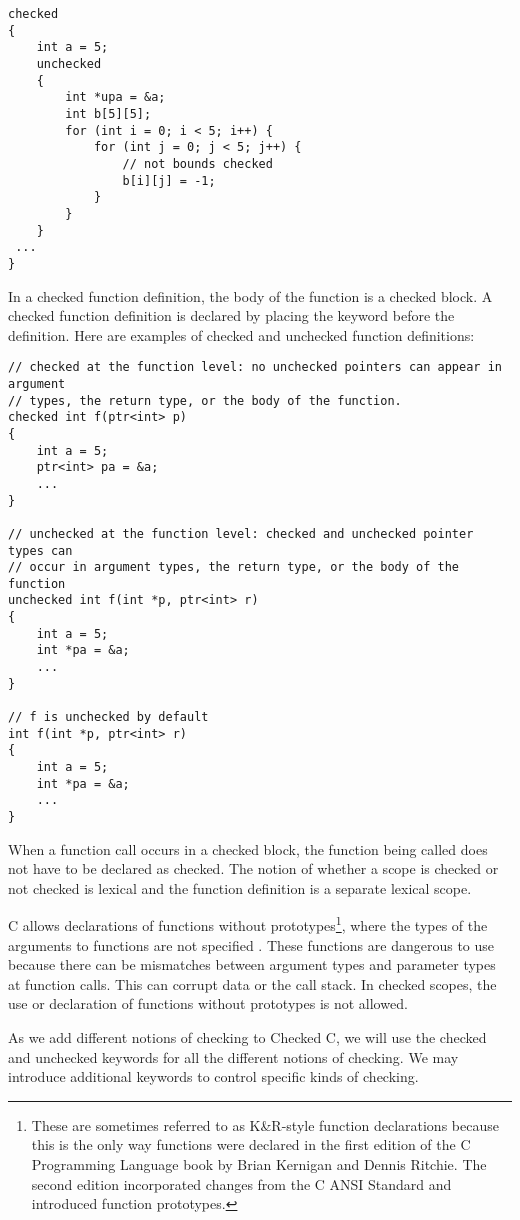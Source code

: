 \begin{verbatim}
checked 
{
    int a = 5;
    unchecked 
    {
        int *upa = &a;	
        int b[5][5];
        for (int i = 0; i < 5; i++) {
            for (int j = 0; j < 5; j++) {
                // not bounds checked
                b[i][j] = -1;
            }
        }     
    }
 ...
}
\end{verbatim}

In a checked function definition, the body of the function is a 
checked  block. A checked function definition is declared by placing the
 keyword before the definition. Here are examples of checked and
unchecked function definitions:

\begin{verbatim}
// checked at the function level: no unchecked pointers can appear in argument
// types, the return type, or the body of the function.
checked int f(ptr<int> p) 
{
    int a = 5;
    ptr<int> pa = &a;
    ...
}

// unchecked at the function level: checked and unchecked pointer types can
// occur in argument types, the return type, or the body of the function
unchecked int f(int *p, ptr<int> r)
{
    int a = 5;
    int *pa = &a;
    ...
}

// f is unchecked by default
int f(int *p, ptr<int> r)
{
    int a = 5;
    int *pa = &a;
    ...
}
\end{verbatim}

When a function call occurs in a checked block, the function being
called does not have to be declared as checked. The notion of whether a
scope is checked or not checked is lexical and the function definition
is a separate lexical scope.

C allows declarations of functions without prototypes\footnote{These are sometimes
referred to as K\&R-style function declarations because this is the only way
functions were  declared in the first edition of the C Programming Language book
by Brian Kernigan and Dennis Ritchie. The second edition incorporated changes from the
C ANSI Standard and introduced function prototypes.}, where the types
of the arguments to functions are not specified .  These
functions are dangerous to use because there can be mismatches 
between argument types and parameter types at function
calls.  This can corrupt data or the call stack.  In checked scopes, 
the use or declaration of  functions without prototypes is not allowed.

As we add different notions of checking to Checked C, we will use the
checked and unchecked keywords for all the different notions of
checking. We may introduce additional keywords to control specific kinds
of checking.

